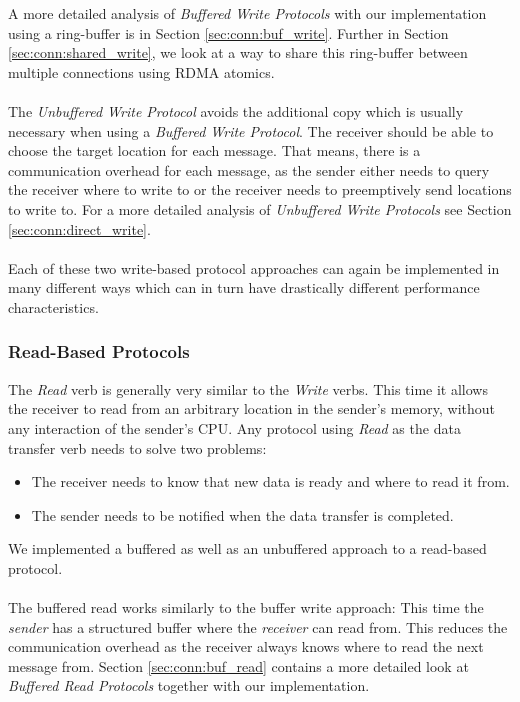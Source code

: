 A more detailed analysis of \emph{Buffered Write Protocols} with our implementation using a ring-buffer is in 
Section \ref{sec:conn:buf_write}. Further in Section \ref{sec:conn:shared_write},
we look at a way to share this ring-buffer between multiple connections using RDMA atomics.


\paragraph{} The  \emph{Unbuffered Write Protocol} avoids the additional copy which is usually necessary when 
using a \emph{Buffered Write Protocol}. The receiver should be able to choose the target location for each message. 
That means, there is a communication overhead for each message, as the sender either needs to query the receiver where to 
write to or the receiver needs to preemptively send locations to write to.
For a more detailed analysis of \emph{Unbuffered Write Protocols} see Section \ref{sec:conn:direct_write}.


\paragraph{}Each of these two write-based protocol approaches can again be implemented in many different ways which can
in turn have drastically different performance characteristics. 


\subsubsection{Read-Based Protocols}
The \emph{Read} verb is generally very similar to the \emph{Write} verbs. This time it allows the receiver to read from 
an arbitrary location in the sender's memory, without any interaction of the sender's CPU. Any protocol
using \emph{Read} as the data transfer verb needs to solve two problems:

\begin{itemize}
  \item The receiver needs to know that new data is ready and where to read it from.
  \item The sender needs to be notified when the data transfer is completed.
\end{itemize}

We implemented a buffered as well as an unbuffered approach to a read-based protocol. 


\paragraph{} The buffered read works similarly to the buffer write approach: This time the \emph{sender} has a structured buffer where the 
\emph{receiver} can read from. This reduces the communication overhead as the receiver always knows where to read the next 
message from. Section \ref{sec:conn:buf_read} contains a more detailed look at \emph{Buffered Read Protocols} together with 
our implementation.

